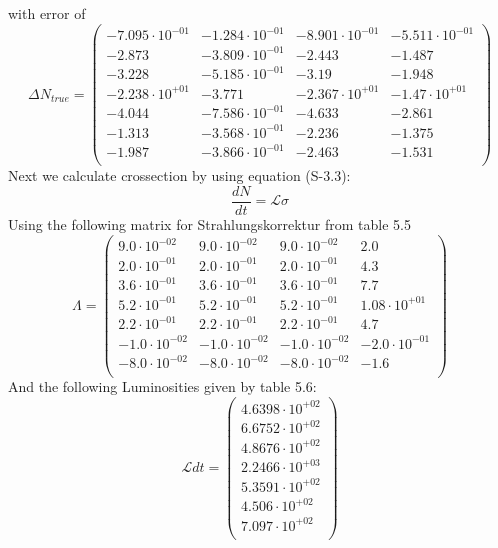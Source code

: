 \documentclass[]{article}
\begin{document}
with error of 
\begin{equation}
\Delta N_{true} = \begin{pmatrix}
   -7.095\cdot 10^{-01} & -1.284\cdot 10^{-01} & -8.901\cdot 10^{-01} & -5.511\cdot 10^{-01} \\
   -2.873 & -3.809\cdot 10^{-01} & -2.443 & -1.487 \\
   -3.228 & -5.185\cdot 10^{-01} & -3.19 & -1.948 \\
   -2.238\cdot 10^{+01} & -3.771 & -2.367\cdot 10^{+01} & -1.47\cdot 10^{+01} \\
   -4.044 & -7.586\cdot 10^{-01} & -4.633 & -2.861 \\
   -1.313 & -3.568\cdot 10^{-01} & -2.236 & -1.375 \\
   -1.987 & -3.866\cdot 10^{-01} & -2.463 & -1.531 \\
\end{pmatrix}
\end{equation}
Next we calculate crossection by using equation (S-3.3):
\begin{equation}
\frac{dN}{dt} = \mathcal{L}\sigma
\label{eq:cs}
\end{equation}
Using the following matrix for Strahlungskorrektur from table 5.5
\begin{equation}
\Lambda = \begin{pmatrix}
   9.0\cdot 10^{-02} & 9.0\cdot 10^{-02} & 9.0\cdot 10^{-02} & 2.0 \\
   2.0\cdot 10^{-01} & 2.0\cdot 10^{-01} & 2.0\cdot 10^{-01} & 4.3 \\
   3.6\cdot 10^{-01} & 3.6\cdot 10^{-01} & 3.6\cdot 10^{-01} & 7.7 \\
   5.2\cdot 10^{-01} & 5.2\cdot 10^{-01} & 5.2\cdot 10^{-01} & 1.08\cdot 10^{+01} \\
   2.2\cdot 10^{-01} & 2.2\cdot 10^{-01} & 2.2\cdot 10^{-01} & 4.7 \\
   -1.0\cdot 10^{-02} & -1.0\cdot 10^{-02} & -1.0\cdot 10^{-02} & -2.0\cdot 10^{-01} \\
   -8.0\cdot 10^{-02} & -8.0\cdot 10^{-02} & -8.0\cdot 10^{-02} & -1.6 \\
\end{pmatrix}
\end{equation}
And the following Luminosities given by table 5.6:
\begin{equation}
\mathcal{L}dt = \begin{pmatrix}
   4.6398\cdot 10^{+02} \\
   6.6752\cdot 10^{+02} \\
   4.8676\cdot 10^{+02} \\
   2.2466\cdot 10^{+03} \\
   5.3591\cdot 10^{+02} \\
   4.506\cdot 10^{+02} \\
   7.097\cdot 10^{+02} \\
\end{pmatrix}
\end{equation}
\end{document}
